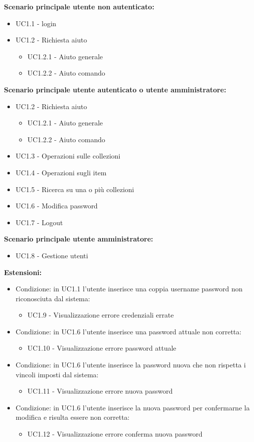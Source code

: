 \documentclass{scalatekids-article}
\begin{document}
\textbf{Scenario principale utente non autenticato:}
\begin{itemize}
\item UC1.1 - login
\item UC1.2 - Richiesta aiuto
  \begin{itemize}
  \item UC1.2.1 - Aiuto generale
  \item UC1.2.2 - Aiuto comando
  \end{itemize}
\end{itemize}
\textbf{Scenario principale utente autenticato o utente amministratore:}
\begin{itemize}
  \item UC1.2 - Richiesta aiuto
  \begin{itemize}
    \item UC1.2.1 - Aiuto generale
    \item UC1.2.2 - Aiuto comando
  \end{itemize}
  \item UC1.3 - Operazioni sulle collezioni
  \item UC1.4 - Operazioni sugli item
  \item UC1.5 - Ricerca su una o più collezioni
  \item UC1.6 - Modifica password
\item UC1.7 - Logout
\end{itemize}
\textbf{Scenario principale utente amministratore:}
\begin{itemize}
  \item UC1.8 - Gestione utenti
\end{itemize}
\textbf{Estensioni:}
\begin{itemize}
  \item Condizione: in UC1.1 l'utente inserisce una coppia username password non riconosciuta dal sistema:
  \begin{itemize}
  \item UC1.9 - Visualizzazione errore credenziali errate
  \end{itemize}
  \item Condizione: in UC1.6 l'utente inserisce una password attuale non corretta:
  \begin{itemize}
  \item UC1.10 - Visualizzazione errore password attuale
  \end{itemize}
  \item Condizione: in UC1.6 l'utente inserisce la password nuova che non rispetta i vincoli imposti dal sistema: %
  \begin{itemize}
    \item UC1.11 - Visualizzazione errore nuova password
  \end{itemize}
  \item Condizione: in UC1.6 l'utente inserisce la nuova password per confermarne la modifica e risulta essere non corretta: %
  \begin{itemize}
    \item UC1.12 - Visualizzazione errore conferma nuova password
  \end{itemize}
\end{itemize}
\end{document}
